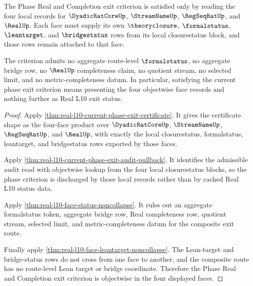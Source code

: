 \begin{theorem}
\label{thm:real-l10-phase-exit-criterion-objectwise}
The Phase Real and Completion exit criterion is satisfied only by reading the
four local records for $\DyadicRatCoreUp$, $\StreamNameUp$, $\RegSeqRatUp$,
and $\RealUp$. Each face must supply its own $\theoryclosure$,
$\formalstatus$, $\leantarget$, and $\bridgestatus$ rows from its local
closurestatus block, and those rows remain attached to that face.

The criterion admits no aggregate route-level $\formalstatus$, no aggregate
bridge row, no $\RealUp$ completeness claim, no quotient stream, no selected
limit, and no metric-completeness datum. In particular, satisfying the current
phase exit criterion means presenting the four objectwise face records and
nothing further as Real L10 exit status.
\end{theorem}
\begin{proof}
Apply \autoref{thm:real-l10-current-phase-exit-certificate}. It gives the
certificate shape as the four-face product over $\DyadicRatCoreUp$,
$\StreamNameUp$, $\RegSeqRatUp$, and $\RealUp$, with exactly the local
closurestatus, formalstatus, leantarget, and bridgestatus rows exported by
those faces.

Apply \autoref{thm:real-l10-current-phase-exit-audit-pullback}. It identifies
the admissible audit read with objectwise lookup from the four local
closurestatus blocks, so the phase criterion is discharged by those local
records rather than by cached Real L10 status data.

Apply \autoref{thm:real-l10-face-status-noncollapse}. It rules out an
aggregate formalstatus token, aggregate bridge row, Real completeness row,
quotient stream, selected limit, and metric-completeness datum for the
composite exit route.

Finally apply \autoref{thm:real-l10-face-leantarget-noncollapse}. The
Lean-target and bridge-status rows do not cross from one face to another, and
the composite route has no route-level Lean target or bridge coordinate.
Therefore the Phase Real and Completion exit criterion is objectwise in the
four displayed faces.
\end{proof}

